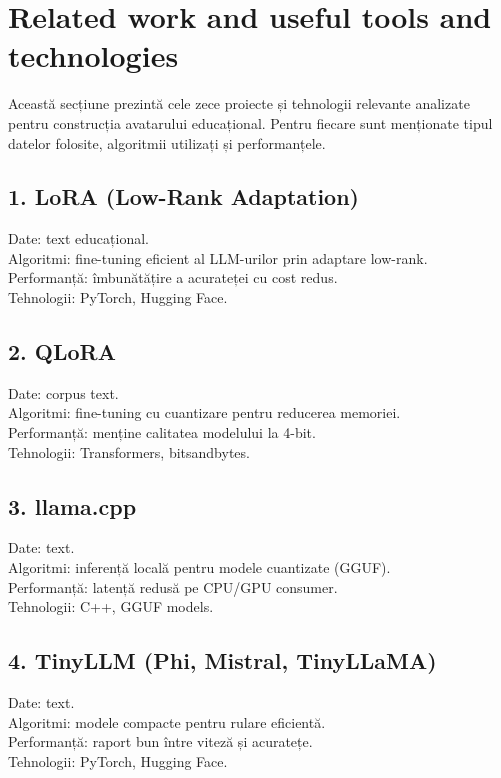 \documentclass[12pt,a4paper]{report}
\begin{document}
\chapter{Related work and useful tools and technologies}

Această secțiune prezintă cele zece proiecte și tehnologii relevante analizate pentru construcția avatarului educațional. Pentru fiecare sunt menționate tipul datelor folosite, algoritmii utilizați și performanțele.

\section{1. LoRA (Low-Rank Adaptation)}
Date: text educațional. \\
Algoritmi: fine-tuning eficient al LLM-urilor prin adaptare low-rank. \\
Performanță: îmbunătățire a acurateței cu cost redus. \\
Tehnologii: PyTorch, Hugging Face.

\section{2. QLoRA}
Date: corpus text. \\
Algoritmi: fine-tuning cu cuantizare pentru reducerea memoriei. \\
Performanță: menține calitatea modelului la 4-bit. \\
Tehnologii: Transformers, bitsandbytes.

\section{3. llama.cpp}
Date: text. \\
Algoritmi: inferență locală pentru modele cuantizate (GGUF). \\
Performanță: latență redusă pe CPU/GPU consumer. \\
Tehnologii: C++, GGUF models.

\section{4. TinyLLM (Phi, Mistral, TinyLLaMA)}
Date: text. \\
Algoritmi: modele compacte pentru rulare eficientă. \\
Performanță: raport bun între viteză și acuratețe. \\
Tehnologii: PyTorch, Hugging Face.
\end{document}

